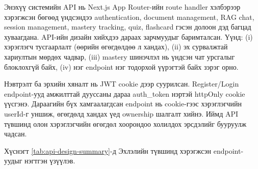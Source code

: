 \documentclass[12pt,A4]{report}
\newcommand{\eng}[1]{#1}
\begin{document}
Энэхүү системийн \eng{API} нь \eng{Next.js App Router}-ийн \eng{route handler} хэлбэрээр хэрэгжсэн бөгөөд үндсэндээ \eng{authentication}, \eng{document management}, \eng{RAG chat}, \eng{session management}, \eng{mastery tracking}, \eng{quiz}, \eng{flashcard} гэсэн долоон дэд багцад хуваагдана. API-ийн дизайн хийхдээ дараах зарчмуудыг баримталсан. Үүнд: (i) хэрэглэгч тусгаарлалт (өөрийн өгөгдөлдөө л хандах), (ii) эх сурвалжтай хариултын мөрдөх чадвар, (iii) \eng{mastery} шинэчлэл нь үндсэн чат урсгалыг блоклохгүй байх, (iv) нэг endpoint нэг тодорхой үүрэгтэй байх зэрэг орно.

Нэвтрэлт ба эрхийн хяналт нь \eng{JWT cookie} дээр суурилсан. \eng{Register/Login} endpoint-ууд амжилттай дууссаны дараа \eng{auth\_token} нэртэй \eng{httpOnly} cookie үүсгэнэ. Дараагийн бүх хамгаалагдсан endpoint нь cookie-гээс хэрэглэгчийн \eng{userId}-г уншиж, өгөгдөлд хандах үед ownership шалгалт хийнэ. Иймд API түвшинд олон хэрэглэгчийн өгөгдөл хоорондоо холилдох эрсдэлийг бууруулж чадсан.

Хүснэгт \ref{tab:api-design-summary}-д Эхлэлийн түвшинд хэрэгжсэн endpoint-уудыг нэгтгэн үзүүлэв.
\end{document}
